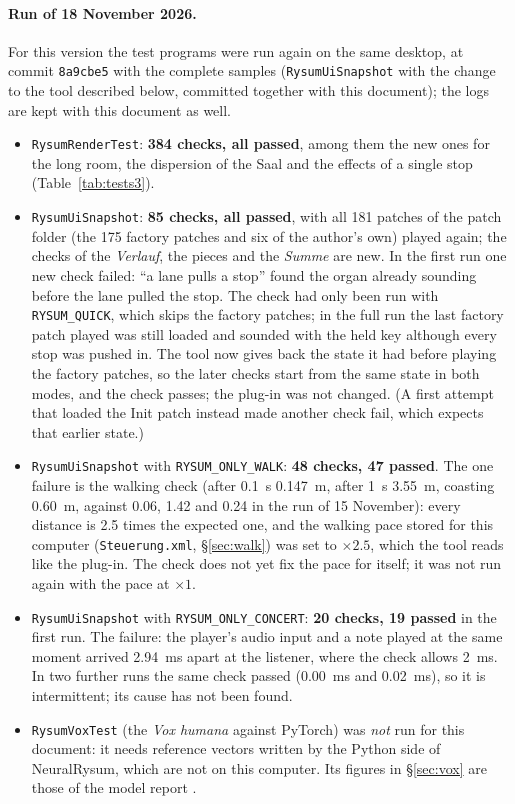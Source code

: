 \documentclass[11pt,a4paper,parskip=half,DIV=11,toc=bibliography]{scrartcl}
\newcommand{\ui}[1]{\emph{#1}}                 %
\newcommand{\code}[1]{\texttt{#1}}
\newcommand{\fn}[1]{\mbox{\texttt{#1}}}
\begin{document}
\paragraph{Run of 18 November 2026.} For this version the test programs were run again on the same desktop, at commit \code{8a9cbe5} with
the complete samples (\fn{RysumUiSnapshot} with the change to the tool described below, committed together with this document); the logs are kept
with this document as well.
\begin{itemize}
  \item \fn{RysumRenderTest}: \textbf{384 checks, all passed}, among them the new ones for the long room, the dispersion of the Saal and the effects
        of a single stop (Table~\ref{tab:tests3}).
  \item \fn{RysumUiSnapshot}: \textbf{85 checks, all passed}, with all 181 patches of the patch folder (the 175 factory patches and six of the author's own)
        played again; the checks of the \ui{Verlauf}, the
        pieces and the \ui{Summe} are new. In the first run one new check failed: \enquote{a lane pulls a stop} found the organ already sounding before
        the lane pulled the stop. The check had only been run with \code{RYSUM\_QUICK}, which skips the factory patches; in the full run the last factory patch
        played was still loaded and sounded with the held key although every stop was pushed in. The tool now gives back the state it had before playing the factory patches, so the
        later checks start from the same state in both modes, and the check passes; the plug-in was not changed. (A first attempt that loaded the
        Init patch instead made another check fail, which expects that earlier state.)
  \item \fn{RysumUiSnapshot} with \code{RYSUM\_ONLY\_WALK}: \textbf{48 checks, 47 passed}. The one failure is the walking check (after
        \SI{0.1}{s} \SI{0.147}{m}, after \SI{1}{s} \SI{3.55}{m}, coasting \SI{0.60}{m}, against 0.06, 1.42 and 0.24 in the run of 15 November): every
        distance is 2.5 times the expected one, and the walking pace stored for this computer (\fn{Steuerung.xml}, \S\ref{sec:walk}) was set to
        $\times2.5$, which the tool reads like the plug-in. The check does not yet fix the pace for itself; it was not run again with the pace at
        $\times1$.
  \item \fn{RysumUiSnapshot} with \code{RYSUM\_ONLY\_CONCERT}: \textbf{20 checks, 19 passed} in the first run. The failure: the player's audio input
        and a note played at the same moment arrived \SI{2.94}{ms} apart at the listener, where the check allows \SI{2}{ms}. In two further runs the
        same check passed (\SI{0.00}{ms} and \SI{0.02}{ms}), so it is intermittent; its cause has not been found.
  \item \fn{RysumVoxTest} (the \ui{Vox humana} against PyTorch) was \emph{not} run for this document: it needs reference vectors written by
        the Python side of NeuralRysum, which are not on this computer. Its figures in \S\ref{sec:vox} are those of the model report
        \citep{neuralrysum2}.
\end{itemize}
\end{document}
